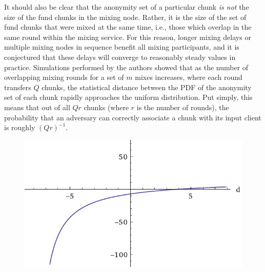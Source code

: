 It should also be clear that the anonymity set of a particular chunk \emph{is not} the size of the fund chunks in the mixing node. Rather, it is the size of the set of fund chunks that were mixed at the same time, i.e., those which overlap in the same round within the mixing service. For this reason, longer mixing delays or multiple mixing nodes in sequence benefit all mixing participants, and it is conjectured that these delays will converge to reasonably steady values in practice. Simulations performed by the authors showed that as the number of overlapping mixing rounds for a set of $m$ mixes increases, where each round transfers $Q$ chunks, the statistical distance between the PDF of the anonymity set of each chunk rapidly approaches the uniform distribution. Put simply, this means that out of all $Qr$ chunks (where $r$ is the number of rounds), the probability that an adversary can correctly associate a chunk with its input client is roughly $(Qr)^{-1}$.

\begin{figure}
\begin{center}
\includegraphics[scale=0.75]{images/mixcoin-delay_plot.pdf}
\label{TODO.}
\label{fig:mix-design}
\end{center}
\end{figure}

